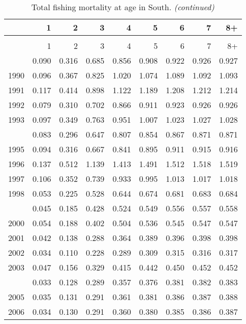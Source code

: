 \documentclass[
]{article}
\begin{document}
\begin{longtable}[t]{lrrrrrrrr}
\caption{\label{tab:South-region-FAA-table}Total fishing mortality at age in South.}\\
\toprule
  & 1 & 2 & 3 & 4 & 5 & 6 & 7 & 8+\\
\midrule
\endfirsthead
\caption[]{Total fishing mortality at age in South. \textit{(continued)}}\\
\toprule
  & 1 & 2 & 3 & 4 & 5 & 6 & 7 & 8+\\
\midrule
\endhead

\endfoot
\bottomrule
\endlastfoot
1989 & 0.090 & 0.316 & 0.685 & 0.856 & 0.908 & 0.922 & 0.926 & 0.927\\
1990 & 0.096 & 0.367 & 0.825 & 1.020 & 1.074 & 1.089 & 1.092 & 1.093\\
1991 & 0.117 & 0.414 & 0.898 & 1.122 & 1.189 & 1.208 & 1.212 & 1.214\\
1992 & 0.079 & 0.310 & 0.702 & 0.866 & 0.911 & 0.923 & 0.926 & 0.926\\
1993 & 0.097 & 0.349 & 0.763 & 0.951 & 1.007 & 1.023 & 1.027 & 1.028\\
\addlinespace
1994 & 0.083 & 0.296 & 0.647 & 0.807 & 0.854 & 0.867 & 0.871 & 0.871\\
1995 & 0.094 & 0.316 & 0.667 & 0.841 & 0.895 & 0.911 & 0.915 & 0.916\\
1996 & 0.137 & 0.512 & 1.139 & 1.413 & 1.491 & 1.512 & 1.518 & 1.519\\
1997 & 0.106 & 0.352 & 0.739 & 0.933 & 0.995 & 1.013 & 1.017 & 1.018\\
1998 & 0.053 & 0.225 & 0.528 & 0.644 & 0.674 & 0.681 & 0.683 & 0.684\\
\addlinespace
1999 & 0.045 & 0.185 & 0.428 & 0.524 & 0.549 & 0.556 & 0.557 & 0.558\\
2000 & 0.054 & 0.188 & 0.402 & 0.504 & 0.536 & 0.545 & 0.547 & 0.547\\
2001 & 0.042 & 0.138 & 0.288 & 0.364 & 0.389 & 0.396 & 0.398 & 0.398\\
2002 & 0.034 & 0.110 & 0.228 & 0.289 & 0.309 & 0.315 & 0.316 & 0.317\\
2003 & 0.047 & 0.156 & 0.329 & 0.415 & 0.442 & 0.450 & 0.452 & 0.452\\
\addlinespace
2004 & 0.033 & 0.128 & 0.289 & 0.357 & 0.376 & 0.381 & 0.382 & 0.383\\
2005 & 0.035 & 0.131 & 0.291 & 0.361 & 0.381 & 0.386 & 0.387 & 0.388\\
2006 & 0.034 & 0.130 & 0.291 & 0.360 & 0.380 & 0.385 & 0.386 & 0.387\\

\end{longtable}
\end{document}
